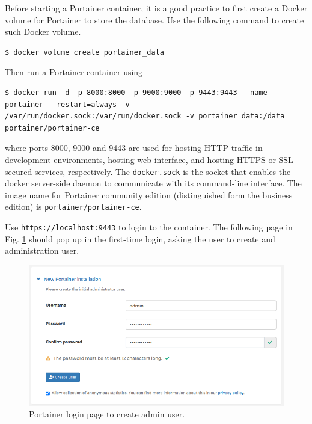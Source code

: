 Before starting a Portainer container, it is a good practice to first create a Docker volume for Portainer to store the database. Use the following command to create such Docker volume.
\begin{lstlisting}
$ docker volume create portainer_data
\end{lstlisting}
Then run a Portainer container using
\begin{lstlisting}
$ docker run -d -p 8000:8000 -p 9000:9000 -p 9443:9443 --name portainer --restart=always -v /var/run/docker.sock:/var/run/docker.sock -v portainer_data:/data portainer/portainer-ce
\end{lstlisting}
where ports 8000, 9000 and 9443 are used for hosting HTTP traffic in development environments, hosting web interface, and hosting HTTPS or SSL-secured services, respectively. The \verb|docker.sock| is the socket that enables the docker server-side daemon to communicate with its command-line interface. The image name for Portainer community edition (distinguished form the business edition) is \verb|portainer/portainer-ce|.

Use \verb|https://localhost:9443| to login to the container. The following page in Fig. \ref{ch:vac:fig:portainerlogin} should pop up in the first-time login, asking the user to create and administration user.
\begin{figure}
	\centering
	\includegraphics[width=350pt]{chapters/ch-virtualization-and-containerization/figures/portainerlogin.png}
	\caption{Portainer login page to create admin user.} \label{ch:vac:fig:portainerlogin}
\end{figure}

